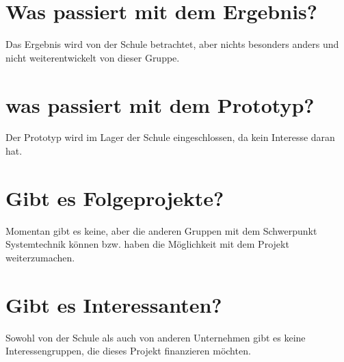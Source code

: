 \section{Was passiert mit dem Ergebnis?}
Das Ergebnis wird von der Schule betrachtet, aber nichts besonders anders und nicht weiterentwickelt von dieser Gruppe.
\section{was passiert mit dem Prototyp?}
Der Prototyp wird im Lager der Schule eingeschlossen, da kein Interesse daran hat. 
\section{Gibt es Folgeprojekte?}
Momentan gibt es keine, aber die anderen Gruppen mit dem Schwerpunkt Systemtechnik können bzw. haben die Möglichkeit mit dem Projekt weiterzumachen.
\section{Gibt es Interessanten?}
Sowohl von der Schule als auch von anderen Unternehmen gibt es keine Interessengruppen, die dieses Projekt finanzieren möchten.
